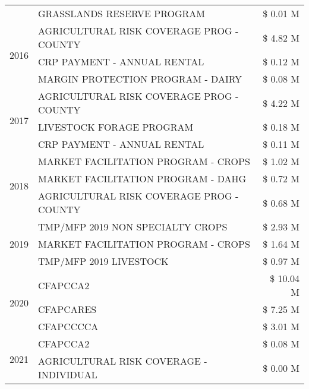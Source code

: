 \begin{tabular}{llr}
 & GRASSLANDS RESERVE PROGRAM & \$ 0.01 M \\
\cline{1-3}
\multirow[t]{3}{*}{2016} & AGRICULTURAL RISK COVERAGE PROG - COUNTY & \$ 4.82 M \\
 & CRP PAYMENT - ANNUAL RENTAL & \$ 0.12 M \\
 & MARGIN PROTECTION PROGRAM - DAIRY & \$ 0.08 M \\
\cline{1-3}
\multirow[t]{3}{*}{2017} & AGRICULTURAL RISK COVERAGE PROG - COUNTY & \$ 4.22 M \\
 & LIVESTOCK FORAGE PROGRAM & \$ 0.18 M \\
 & CRP PAYMENT - ANNUAL RENTAL & \$ 0.11 M \\
\cline{1-3}
\multirow[t]{3}{*}{2018} & MARKET FACILITATION PROGRAM - CROPS & \$ 1.02 M \\
 & MARKET FACILITATION PROGRAM - DAHG & \$ 0.72 M \\
 & AGRICULTURAL RISK COVERAGE PROG - COUNTY & \$ 0.68 M \\
\cline{1-3}
\multirow[t]{3}{*}{2019} & TMP/MFP 2019 NON SPECIALTY CROPS & \$ 2.93 M \\
 & MARKET FACILITATION PROGRAM - CROPS & \$ 1.64 M \\
 & TMP/MFP 2019 LIVESTOCK & \$ 0.97 M \\
\cline{1-3}
\multirow[t]{3}{*}{2020} & CFAPCCA2 & \$ 10.04 M \\
 & CFAPCARES & \$ 7.25 M \\
 & CFAPCCCCA & \$ 3.01 M \\
\cline{1-3}
\multirow[t]{2}{*}{2021} & CFAPCCA2 & \$ 0.08 M \\
 & AGRICULTURAL RISK COVERAGE - INDIVIDUAL & \$ 0.00 M \\
\cline{1-3}
\bottomrule
\end{tabular}
